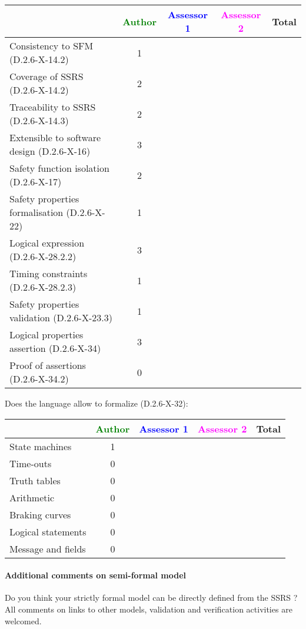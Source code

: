\begin{tabular}{|l | c | c | c | c|}
\hline
& \textcolor{green}{Author} & \textcolor{blue}{Assessor 1} & \textcolor{magenta}{Assessor 2} & Total \\
\hline
Consistency to SFM (D.2.6-X-14.2) & 1 & & & \\
\hline
Coverage of SSRS (D.2.6-X-14.2) & 2 & & & \\
\hline
Traceability to SSRS (D.2.6-X-14.3) & 2 && & \\
\hline
Extensible to software design (D.2.6-X-16) & 3 & & & \\
\hline
Safety function isolation (D.2.6-X-17) & 2 & & & \\
\hline
Safety properties formalisation (D.2.6-X-22) & 1 & & & \\
\hline
Logical expression (D.2.6-X-28.2.2) & 3 & & & \\
\hline
Timing constraints (D.2.6-X-28.2.3) & 1 & & & \\
\hline
Safety properties validation (D.2.6-X-23.3) & 1 & & & \\
\hline
Logical properties assertion (D.2.6-X-34) & 3 & & & \\
\hline
Proof of assertions (D.2.6-X-34.2) & 0 & & & \\
\hline
\end{tabular}

Does the language allow to formalize (D.2.6-X-32):

\begin{tabular}{|l | c | c | c | c|}
\hline
& \textcolor{green}{Author} & \textcolor{blue}{Assessor 1} & \textcolor{magenta}{Assessor 2} & Total \\
\hline
State machines & 1 & & & \\
\hline
Time-outs & 0 &  & & \\
\hline
Truth tables & 0 & & & \\
\hline
Arithmetic & 0 & & & \\
\hline
Braking curves & 0 & & & \\
\hline
Logical statements & 0 & & & \\
\hline
Message and fields & 0 & & & \\
\hline
\end{tabular}

\paragraph{Additional comments on semi-formal model} Do you think your strictly formal model can be directly defined from the SSRS ?
All comments on links to other models, validation and verification activities are welcomed.

